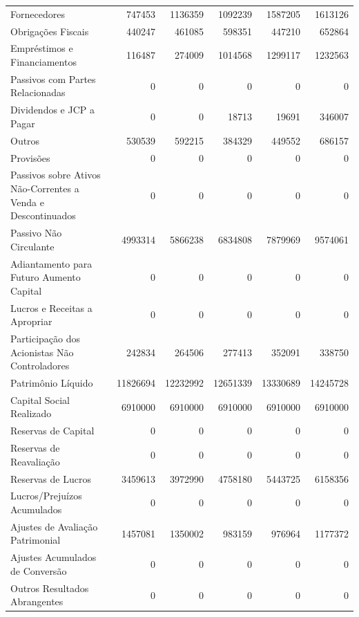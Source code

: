 \documentclass[grad,numbers]{coppe}
\begin{document}
\begin{longtable}[t]{lrrrrr}
  Fornecedores & 747453 & 1136359 & 1092239 & 1587205 & 1613126\\
  Obrigações Fiscais & 440247 & 461085 & 598351 & 447210 & 652864\\
  \addlinespace
  Empréstimos e Financiamentos & 116487 & 274009 & 1014568 & 1299117 & 1232563\\
  Passivos com Partes Relacionadas & 0 & 0 & 0 & 0 & 0\\
  Dividendos e JCP a Pagar & 0 & 0 & 18713 & 19691 & 346007\\
  Outros & 530539 & 592215 & 384329 & 449552 & 686157\\
  Provisões & 0 & 0 & 0 & 0 & 0\\
  \addlinespace
  Passivos sobre Ativos Não-Correntes a Venda e Descontinuados & 0 & 0 & 0 & 0 & 0\\
  Passivo Não Circulante & 4993314 & 5866238 & 6834808 & 7879969 & 9574061\\
  Adiantamento para Futuro Aumento Capital & 0 & 0 & 0 & 0 & 0\\
  Lucros e Receitas a Apropriar & 0 & 0 & 0 & 0 & 0\\
  Participação dos Acionistas Não Controladores & 242834 & 264506 & 277413 & 352091 & 338750\\
  \addlinespace
  Patrimônio Líquido & 11826694 & 12232992 & 12651339 & 13330689 & 14245728\\
  Capital Social Realizado & 6910000 & 6910000 & 6910000 & 6910000 & 6910000\\
  Reservas de Capital & 0 & 0 & 0 & 0 & 0\\
  Reservas de Reavaliação & 0 & 0 & 0 & 0 & 0\\
  Reservas de Lucros & 3459613 & 3972990 & 4758180 & 5443725 & 6158356\\
  \addlinespace
  Lucros/Prejuízos Acumulados & 0 & 0 & 0 & 0 & 0\\
  Ajustes de Avaliação Patrimonial & 1457081 & 1350002 & 983159 & 976964 & 1177372\\
  Ajustes Acumulados de Conversão & 0 & 0 & 0 & 0 & 0\\
  Outros Resultados Abrangentes & 0 & 0 & 0 & 0 & 0\\*
  \end{longtable}
  \endgroup{}
\end{document}
